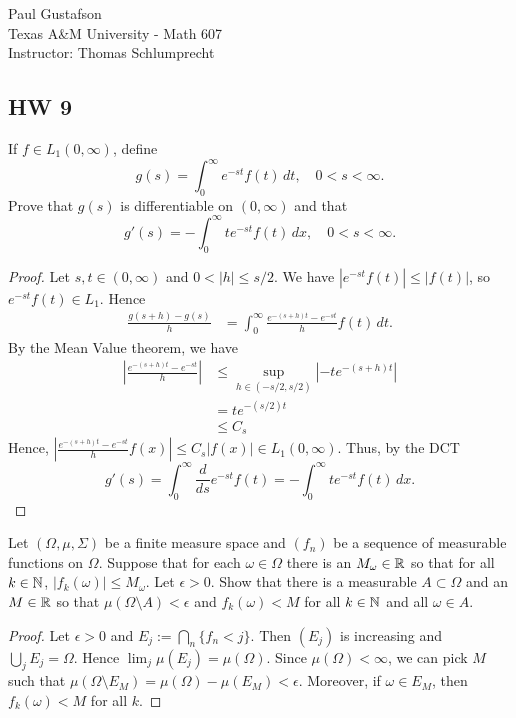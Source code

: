 \documentclass{article}
\begin{document}
\noindent Paul Gustafson\\
\noindent Texas A\&M University - Math 607\\ 
\noindent Instructor: Thomas Schlumprecht

\subsection*{HW 9}
 If $f \in L_1(0,\infty)$, define
$$g(s) = \int_0^\infty e^{-st}f(t) \,dt, \quad 0 < s < \infty.$$
Prove that $g(s)$ is differentiable on $(0,\infty)$ and that
$$g'(s) = - \int_0^\infty t e^{-st} f(t) \, dx, \quad 0 < s < \infty.$$
\begin{proof}
Let $s,t \in (0,\infty)$ and $0 < |h| \le s/2$. We have $|e^{-st}f(t)| \le |f(t)|$, so $e^{-st}f(t) \in L_1$. Hence 
\begin{align*}
\frac { g(s + h) - g(s)} h & = \int_0^\infty \frac {e^{-(s+h)t} - e^{-st}} h  f(t) \,dt.
\end{align*}
By the Mean Value theorem, we have  
\begin{align*}
\left|\frac {e^{-(s+h)t} - e^{-st}} h \right| & \le \sup_{h \in (-s/2,s/2)} |-t e^{-(s+h)t}| 
\\ & = t e^{-(s/2)t} 
\\ &  \le C_s
\end{align*}
Hence, $\left|\frac {e^{-(s+h)t} - e^{-st}} h f(x)\right| \le C_s |f(x)| \in L_1(0,\infty)$. Thus, by the DCT
$$g'(s)  = \int_0^\infty \frac d {ds} e^{-st} f(t) = - \int_0^\infty t e^{-st} f(t) \, dx. $$
\end{proof}

 Let $(\Omega, \mu, \Sigma)$ be a finite measure space and $(f_n)$ be a sequence of measurable functions on $\Omega$. Suppose that for each $\omega \in \Omega$ there is an $M_\omega \in \mathbb{R}$ so that for all $k \in \mathbb{N}$, $|f_k(\omega)| \le M_\omega$. Let $\epsilon > 0$. Show that there is a measurable $A \subset \Omega$ and an $M \in \mathbb{R}$ so that $\mu(\Omega \setminus A) < \epsilon$ and $f_k(\omega) < M$ for all $k \in \mathbb{N}$ and all $\omega \in A$.
\begin{proof}
Let $\epsilon > 0$ and $E_j := \bigcap_n \{f_n < j \}$.  Then $(E_j)$ is increasing and $\bigcup_j E_j = \Omega$. Hence $\lim_j \mu(E_j) = \mu(\Omega)$.  Since $\mu(\Omega) < \infty$, we can pick $M$ such that $\mu(\Omega \setminus E_M) = \mu(\Omega) - \mu(E_M) < \epsilon$. Moreover, if $\omega \in E_M$, then $f_k(\omega) < M$ for all $k$.
\end{proof}
\end{document}
